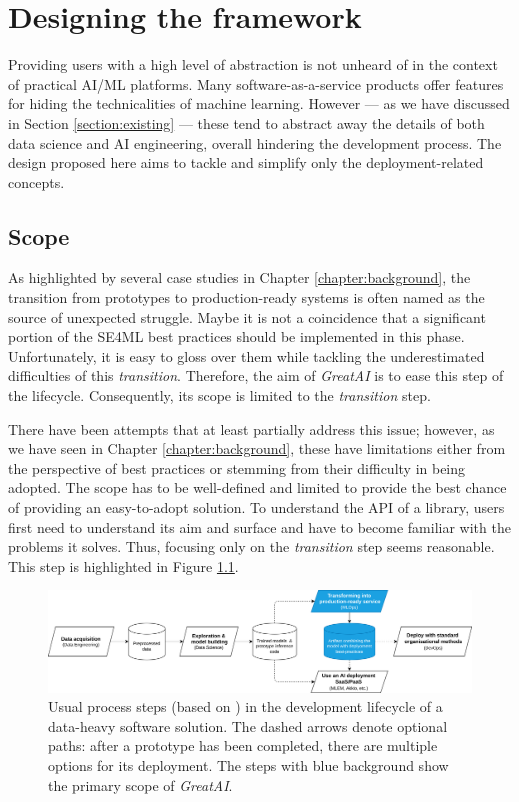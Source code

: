 \chapter{Designing the framework} \label{chapter:design}

Providing users with a high level of abstraction is not unheard of in the context of practical AI/ML platforms. Many software-as-a-service products offer features for hiding the technicalities of machine learning. However --- as we have discussed in Section \ref{section:existing} --- these tend to abstract away the details of both data science and AI engineering, overall hindering the development process. The design proposed here aims to tackle and simplify only the deployment-related concepts.

\section{Scope} \label{section:scope}

As highlighted by several case studies in Chapter \ref{chapter:background}, the transition from prototypes to production-ready systems is often named as the source of unexpected struggle. Maybe it is not a coincidence that a significant portion of the SE4ML best practices should be implemented in this phase. Unfortunately, it is easy to gloss over them while tackling the underestimated difficulties of this \textit{transition}. Therefore, the aim of \textit{GreatAI} is to ease this step of the lifecycle. Consequently, its scope is limited to the \textit{transition} step.

There have been attempts that at least partially address this issue; however, as we have seen in Chapter \ref{chapter:background}, these have limitations either from the perspective of best practices or stemming from their difficulty in being adopted. The scope has to be well-defined and limited to provide the best chance of providing an easy-to-adopt solution. To understand the API of a library, users first need to understand its aim and surface and have to become familiar with the problems it solves. Thus, focusing only on the \textit{transition} step seems reasonable. This step is highlighted in Figure \ref{fig:scope}.

\begin{figure}
    \centering
    \includegraphics[width=\linewidth]{figures/scope.drawio.png}
    \captionsetup{width=.9\linewidth}
    \caption{Usual process steps (based on \cite{john2020architecting}) in the development lifecycle of a data-heavy software solution. The dashed arrows denote optional paths: after a prototype has been completed, there are multiple options for its deployment. The steps with blue background show the primary scope of \textit{GreatAI}.}
    \label{fig:scope}
\end{figure}

